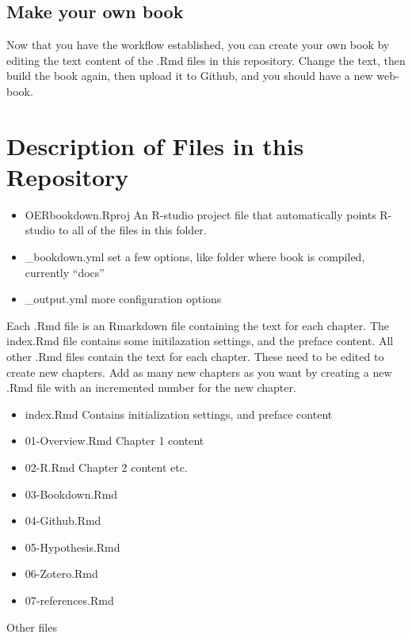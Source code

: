 \documentclass[]{book}
\providecommand{\tightlist}{%
  \setlength{\itemsep}{0pt}\setlength{\parskip}{0pt}}
\theoremstyle{definition}
\theoremstyle{definition}
\theoremstyle{definition}
\theoremstyle{remark}
\begin{document}
\subsection{Make your own book}\label{make-your-own-book}

Now that you have the workflow established, you can create your own book
by editing the text content of the .Rmd files in this repository. Change
the text, then build the book again, then upload it to Github, and you
should have a new web-book.

\section{Description of Files in this
Repository}\label{description-of-files-in-this-repository}

\begin{itemize}
\item
  OERbookdown.Rproj An R-studio project file that automatically points
  R-studio to all of the files in this folder.
\item
  \_bookdown.yml set a few options, like folder where book is compiled,
  currently ``docs''
\item
  \_output.yml more configuration options
\end{itemize}

Each .Rmd file is an Rmarkdown file containing the text for each
chapter. The index.Rmd file contains some initilazation settings, and
the preface content. All other .Rmd files contain the text for each
chapter. These need to be edited to create new chapters. Add as many new
chapters as you want by creating a new .Rmd file with an incremented
number for the new chapter.

\begin{itemize}
\tightlist
\item
  index.Rmd Contains initialization settings, and preface content
\item
  01-Overview.Rmd Chapter 1 content
\item
  02-R.Rmd Chapter 2 content etc.
\item
  03-Bookdown.Rmd
\item
  04-Github.Rmd
\item
  05-Hypothesis.Rmd
\item
  06-Zotero.Rmd
\item
  07-references.Rmd
\end{itemize}

Other files
\end{document}
